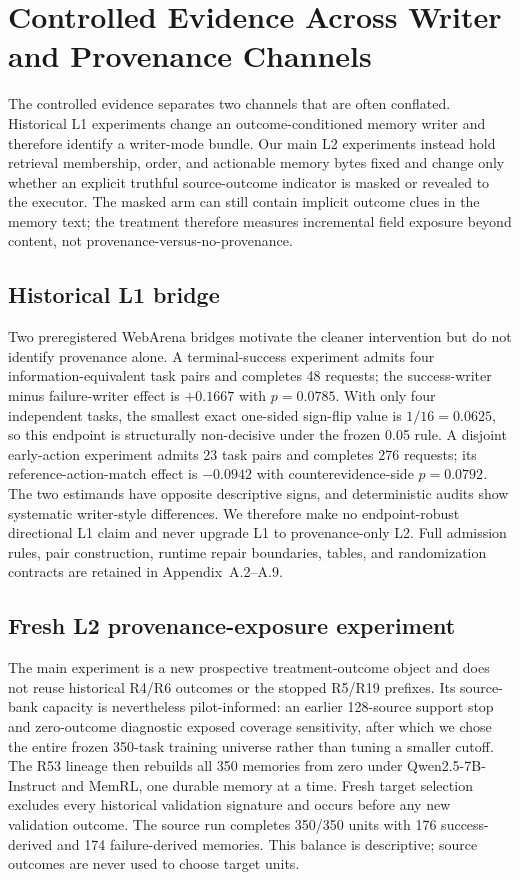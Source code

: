 \section{Controlled Evidence Across Writer and Provenance Channels}
\label{sec:intervention}
The controlled evidence separates two channels that are often conflated. Historical L1 experiments change an outcome-conditioned memory writer and therefore identify a writer-mode bundle. Our main L2 experiments instead hold retrieval membership, order, and actionable memory bytes fixed and change only whether an explicit truthful source-outcome indicator is masked or revealed to the executor. The masked arm can still contain implicit outcome clues in the memory text; the treatment therefore measures incremental field exposure beyond content, not provenance-versus-no-provenance.

\subsection{Historical L1 bridge}
Two preregistered WebArena bridges motivate the cleaner intervention but do not identify provenance alone. A terminal-success experiment admits four information-equivalent task pairs and completes 48 requests; the success-writer minus failure-writer effect is $+0.1667$ with $p=0.0785$. With only four independent tasks, the smallest exact one-sided sign-flip value is $1/16=0.0625$, so this endpoint is structurally non-decisive under the frozen 0.05 rule. A disjoint early-action experiment admits 23 task pairs and completes 276 requests; its reference-action-match effect is $-0.0942$ with counterevidence-side $p=0.0792$. The two estimands have opposite descriptive signs, and deterministic audits show systematic writer-style differences. We therefore make no endpoint-robust directional L1 claim and never upgrade L1 to provenance-only L2. Full admission rules, pair construction, runtime repair boundaries, tables, and randomization contracts are retained in Appendix~A.2--A.9.

\subsection{Fresh L2 provenance-exposure experiment}
\label{sec:l2fresh}
The main experiment is a new prospective treatment-outcome object and does not reuse historical R4/R6 outcomes or the stopped R5/R19 prefixes. Its source-bank capacity is nevertheless pilot-informed: an earlier 128-source support stop and zero-outcome diagnostic exposed coverage sensitivity, after which we chose the entire frozen 350-task training universe rather than tuning a smaller cutoff. The R53 lineage then rebuilds all 350 memories from zero under Qwen2.5-7B-Instruct and MemRL, one durable memory at a time. Fresh target selection excludes every historical validation signature and occurs before any new validation outcome. The source run completes 350/350 units with 176 success-derived and 174 failure-derived memories. This balance is descriptive; source outcomes are never used to choose target units.

